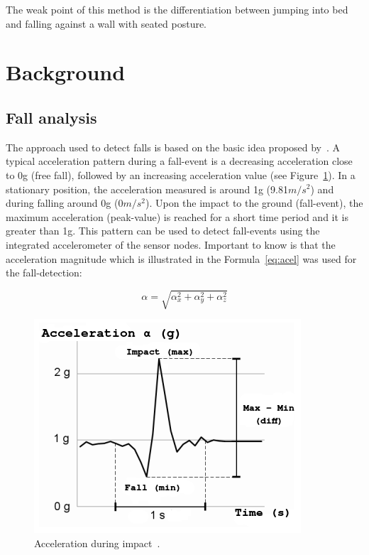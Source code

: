 \documentclass[review]{elsarticle}
\begin{document}
The weak point of this method is the differentiation between jumping into bed and falling against a wall with seated posture.

\section{Background}
\label{sec:background}

\subsection{Fall analysis}
\label{subsec:analysis}

The approach used to detect falls is based on the basic idea proposed by~\cite{Gjoreski2014,Kozina}. A typical acceleration pattern during 
a fall-event is a decreasing acceleration close to 0g (free fall), followed by an increasing acceleration value (see Figure~\ref{fig:grafica}). In a stationary position, 
the acceleration measured is around 1g (9.81$m/s^{2}$) and during falling around 0g (0$m/s^{2}$). Upon the impact to the ground (fall-event), 
the maximum acceleration (peak-value) is reached for a short time period and it is greater than 1g. This pattern can be used to 
detect fall-events using the integrated accelerometer of the sensor nodes. Important to know is that the acceleration 
magnitude which is illustrated in the Formula~\ref{eq:acel} was used for the fall-detection:

\begin{equation}\label{eq:acel}
 \alpha = \sqrt{\alpha_{x}^{2} + \alpha_{y}^{2} + \alpha_{z}^{2}}
\end{equation}

\begin{figure}[!ht]
  \centering
  \includegraphics[scale=0.6]{img/FallGraph}
  \caption[Acceleration during impact]{Acceleration during impact~\cite{Kozina}.}
  \label{fig:grafica}
\end{figure}
\end{document}
